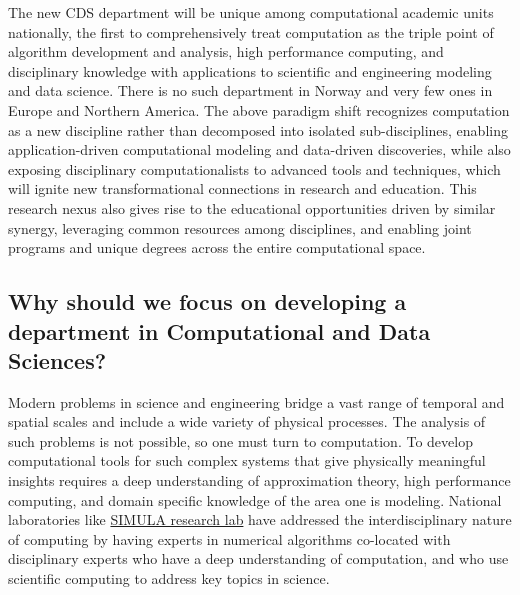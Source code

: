 \documentclass[oneside,final,10pt]{article}
\begin{document}
The new CDS department  will be unique among computational academic units nationally, the first to comprehensively
treat computation as the triple point of algorithm development and analysis, high performance
computing, and disciplinary knowledge with applications to scientific and engineering modeling
and data science. There is no such department in Norway and very few ones in Europe and Northern America. 
The above paradigm shift recognizes computation as a new discipline rather
than decomposed into isolated sub-disciplines, enabling application-driven computational
modeling and data-driven discoveries, while also exposing disciplinary computationalists to advanced tools and
techniques, which will ignite new transformational connections in research and
education. This research nexus also gives rise to the educational opportunities driven by similar
synergy, leveraging common resources among disciplines, and enabling joint programs and
unique degrees across the entire computational space.



\subsection*{Why should we focus on developing a department in Computational and Data Sciences?}

Modern problems in science and engineering bridge a vast range of temporal and spatial scales
and include a wide variety of physical processes. The analysis of such problems is not possible, so
one must turn to computation. To develop computational tools for such complex systems that
give physically meaningful insights requires a deep understanding of approximation theory, high
performance computing, and domain specific knowledge of the area one is modeling. National laboratories like \href{{https://www.simula.no/}}{SIMULA research lab} have addressed the interdisciplinary nature of computing by having experts
in numerical algorithms co-located with disciplinary experts who have a deep understanding of
computation, and who use scientific computing to address key topics in science.
\end{document}
